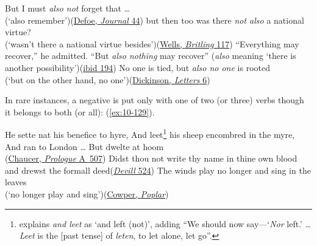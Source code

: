 \ea \label{ex:10-125}
\ea
But I must \emph{also not} forget that {\dots} \\(`also remember')\hfill(\href{https://archive.org/details/journalofplaguey1881defo/page/44/mode/2up?view=theater&q=%22must+also+not+forget%22}{Defoe, \textit{Journal} 44})
\ex
but then too was there \emph{not also} a national virtue? \\(`wasn't there a national virtue besides')\hfill(\href{https://archive.org/details/mrbritlingseesi02unkngoog/page/n130/mode/2up?view=theater&q=%22then+too+was+there%22}{Wells, \textit{Britling} 117})
\ex
``Everything may recover,'' he admitted. ``But \emph{also nothing} may recover'' \phantom{x} (\textit{also} meaning `there is another possibility')\hfill(\href{https://archive.org/details/mrbritlingseesi02unkngoog/page/n210/mode/2up?view=theater&q=%22everything+may+recover%22}{ibid 194}) %
\ex \label{ex:10-rooted}
No one is tied, but \emph{also no one} is rooted \\(`but on the other hand, no one')\hfill(\href{https://archive.org/details/fromjohnchinaman00dickiala/page/6/mode/2up?q=%22no+one+is+tied%22&view=theater}{Dickinson, \textit{Letters} 6})
\z
\z


In rare instances, a negative is put only with one of two (or three) verbs though it belongs to both (or all): (\ref{ex:10-129}).

\ea \label{ex:10-129}
He sette nat his benefice to hyre, And leet\footnote{\citet{skeat1900chaucer} explains \textit{and leet} as `and left (not)', adding ``We should now say---`\textit{Nor} left.' {\dots} \textit{Leet} is the [past tense] of \textit{leten}, to let alone, let go''. \eds} %
 his sheep encombred in the myre, And ran to London {\dots} But dwelte at hoom\\\hfill(\href{https://archive.org/details/completeworksofg04chauuoft/completeworksofg04chauuoft/page/14/mode/2up?q=%22He+sette+nat%22&view=theater}{Chaucer, \textit{Prologue} A~507})
\ex
Didst thou not write thy name in thine own blood and drewst the formall deed\hfill(\href{https://archive.org/details/merrydeviledmon01shakgoog/page/n29/mode/2up?q=%22Didst+thou+not%22&view=theater}{\textit{Devill} 524}) %
\ex
The winds play no longer and sing in the leaves\\ (`no longer play and sing')\hfill(\href{https://archive.org/details/poemsofwilliamco00cowp/page/376/mode/2up?q=%22winds+play+no+longer%22&view=theater}{Cowper, \textit{Poplar}})
\z

